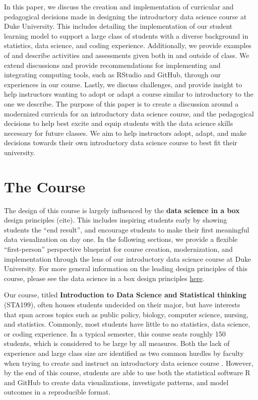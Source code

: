 \documentclass[
  12pt]{article}
\begin{document}
In this paper, we discuss the creation and implementation of curricular
and pedagogical decisions made in designing the introductory data
science course at Duke University. This includes detailing the
implementation of our student learning model to support a large class of
students with a diverse background in statistics, data science, and
coding experience. Additionally, we provide examples of and describe
activities and assessments given both in and outside of class. We extend
discussions and provide recommendations for implementing and integrating
computing tools, such as RStudio and GitHub, through our experiences in
our course. Lastly, we discuss challenges, and provide insight to help
instructors wanting to adopt or adapt a course similar to introductory
to the one we describe. The purpose of this paper is to create a
discussion around a modernized curricula for an introductory data
science course, and the pedagogical decisions to help best excite and
equip students with the data science skills necessary for future
classes. We aim to help instructors adopt, adapt, and make decisions
towards their own introductory data science course to best fit their
university.

\hypertarget{sec-course}{%
\section{The Course}\label{sec-course}}

The design of this course is largely influenced by the \textbf{data
science in a box} design principles (cite). This includes inspiring
students early by showing students the ``end result'', and encourage
students to make their first meaningful data visualization on day one.
In the following sections, we provide a flexible ``first-person''
perspective blueprint for course creation, modernization, and
implementation through the lens of our introductory data science course
at Duke University. For more general information on the leading design
principles of this course, please see the data science in a box design
principles
\href{https://datasciencebox.org/01-design-principles.html}{here}.

Our course, titled \textbf{Introduction to Data Science and Statistical
thinking} (STA199), often houses students undecided on their major, but
have interests that span across topics such as public policy, biology,
computer science, nursing, and statistics. Commonly, most students have
little to no statistics, data science, or coding experience. In a
typical semester, this course seats roughly 150 students, which is
considered to be large by all measures. Both the lack of experience and
large class size are identified as two common hurdles by faculty when
trying to create and instruct an introductory data science course
\citep{Schwab2020, Kok_2008}. However, by the end of this course,
students are able to use both the statistical software R and GitHub to
create data visualizations, investigate patterns, and model outcomes in
a reproducible format.
\end{document}
